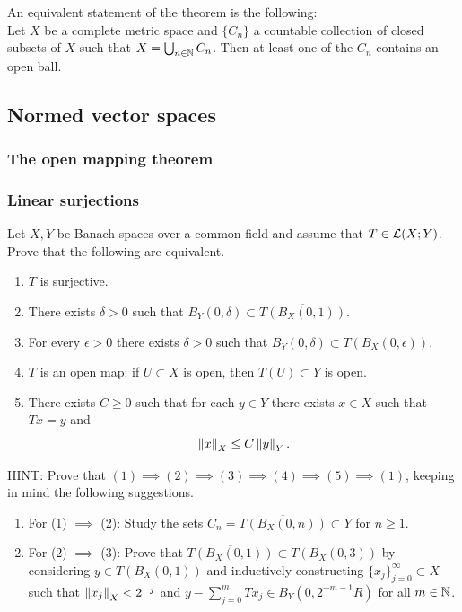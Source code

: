 \documentclass[a4paper]{article}
\begin{document}
\begin{remark}
  An equivalent statement of the theorem is the following: \\ Let $X$ be a
  complete metric space and $\{C_n\}$ a countable collection of closed
  subsets of $X$ such that $X = \bigcup_{n \in \mathbb{N}} C_n $. Then at least
  one of the $C_n$ contains an open ball.
\end{remark}

\subsection{Normed vector spaces}

\subsubsection{The open mapping theorem}

\subsubsection*{Linear surjections}

\begin{thm}
  Let $X,Y$ be Banach spaces over a common field and assume that
  $T \in \mathcal{L}(X;Y)$.  Prove that the following are equivalent.
  \begin{enumerate}
    \item $T$ is surjective.

    \item There exists $\delta >0$ such that $B_Y(0,\delta) \subset
          \overline{T(B_X(0,1))}$.

    \item For every $\epsilon >0$ there exists $\delta >0$ such that
          $B_Y(0,\delta) \subset T(B_X(0,\epsilon))$.

    \item $T$ is an open map: if $U\subset X$ is open, then
          $T(U) \subset Y$ is open.

    \item There exists $C \ge 0$ such that for each $y \in Y$ there exists
          $x \in X$ such that $Tx=y$ and
          \[
            \left\lVert x\right\rVert_X \leq C \left\lVert y\right\rVert_Y.
          \]
  \end{enumerate}
  HINT: Prove that  $(1) \implies (2) \implies (3)
    \implies (4) \implies (5)  \implies (1)$, keeping
  in mind the following suggestions.
  \begin{enumerate}
    \item For (1) $\implies$ (2): Study the sets $C_n =
          \overline{T(B_X(0,n))} \subset Y$ for $n \ge 1$.
    \item For (2) $\implies$ (3): Prove that $\overline{T(B_X(0,1) )}
          \subset T(B_X(0,3))$ by considering $y \in\overline{T(B_X(0,1)
          )}$ and inductively constructing $\{x_j\}_{j=0}^\infty \subset
          X$ such that $\left\lVert x_j\right\rVert_X < 2^{-j}$ and $y - \sum_{j=0}^m T x_j
          \in B_Y(0,2^{-m-1} R)$ for all $m \in \mathbb{N}$.
  \end{enumerate}
\end{thm}
\end{document}
